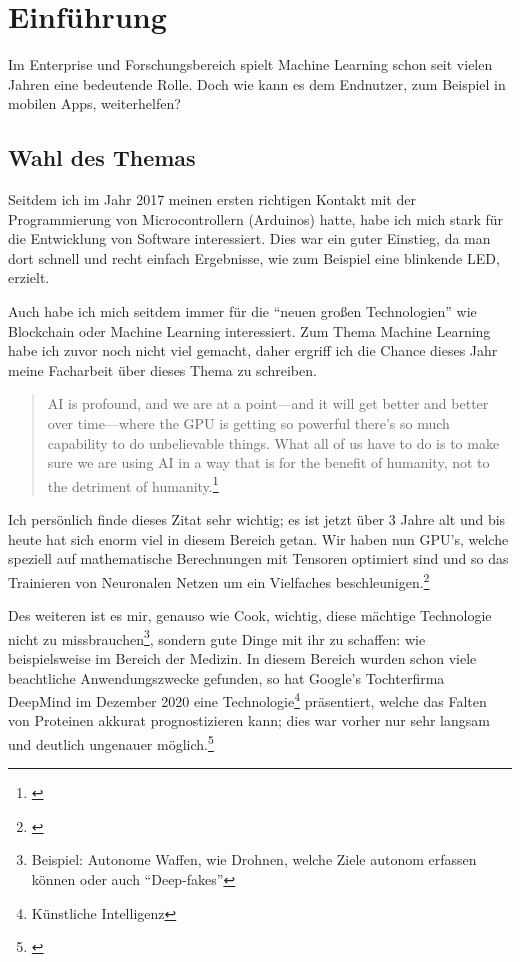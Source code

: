 \section{Einführung}
Im Enterprise und Forschungsbereich spielt Machine Learning schon seit vielen Jahren eine bedeutende Rolle. Doch wie kann es dem Endnutzer, zum Beispiel in mobilen Apps, weiterhelfen?

\subsection{Wahl des Themas}

Seitdem ich im Jahr 2017 meinen ersten richtigen Kontakt mit der Programmierung von Microcontrollern (Arduinos) hatte, habe ich mich stark für die Entwicklung von Software interessiert. Dies war ein guter Einstieg, da man dort schnell und recht einfach Ergebnisse, wie zum Beispiel eine blinkende LED, erzielt.

Auch habe ich mich seitdem immer für die "`neuen großen Technologien"' wie Blockchain oder Machine Learning interessiert. Zum Thema Machine Learning habe ich zuvor noch nicht viel gemacht, daher ergriff ich die Chance dieses Jahr meine Facharbeit über dieses Thema zu schreiben.


\begin{quotation}
    AI is profound, and we are at a point—and it will get better and better over time—where the GPU is getting so powerful there’s so much capability to do unbelievable things. What all of us have to do is to make sure we are using AI in a way that is for the benefit of humanity, not to the detriment of humanity.\footnote{\cite[Tim Cook (CEO von Apple) In einem Interview mit MIT Technology Review]{timcookquote}}
\end{quotation}

Ich persönlich finde dieses Zitat sehr wichtig; es ist jetzt über 3 Jahre alt und bis heute hat sich enorm viel in diesem Bereich getan. Wir haben nun GPU's, welche speziell auf mathematische Berechnungen mit Tensoren optimiert sind und so das Trainieren von Neuronalen Netzen um ein Vielfaches beschleunigen.\footnote{\cite[NVIDIA Grafikprozessoren mit integrierten Tensor Kernen]{nvidiatensorcores}}

Des weiteren ist es mir, genauso wie Cook, wichtig, diese mächtige Technologie nicht zu missbrauchen\footnote{Beispiel: Autonome Waffen, wie Drohnen, welche Ziele autonom erfassen können oder auch "`Deep-fakes"'}, sondern gute Dinge mit ihr zu schaffen: wie beispielsweise im Bereich der Medizin. In diesem Bereich wurden schon viele beachtliche Anwendungszwecke gefunden, so hat Google's Tochterfirma DeepMind im Dezember 2020 eine Technologie\footnote{Künstliche Intelligenz} präsentiert, welche das Falten von Proteinen akkurat prognostizieren kann; dies war vorher nur sehr langsam und deutlich ungenauer möglich.\footnote{\cite{deepmindprotein}}


